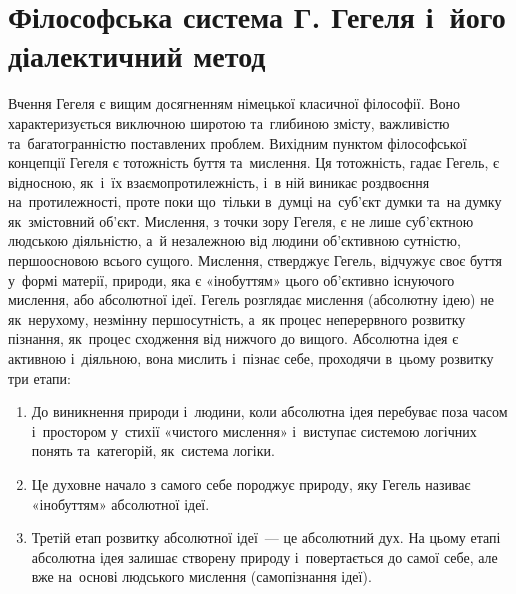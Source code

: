 \documentclass[a5paper,oneside,DIV=12,12pt,headings=small]{scrartcl}
\begin{document}
	\section{Філософська система Г. Гегеля і~його діалектичний метод}
		Вчення Гегеля є вищим досягненням німецької класичної філософії. Воно характеризується виключною широтою та~глибиною змісту, важливістю та~багатогранністю поставлених проблем. Вихідним пунктом філософської концепції Гегеля є тотожність буття та~мислення. Ця тотожність, гадає Гегель, є відносною, як~і~їх взаємопротилежність, і~в ній виникає роздвоєння на~протилежності, проте поки що~тільки в~думці на~суб'єкт думки та~на думку як~змістовний об'єкт. Мислення, з точки зору Гегеля, є не лише суб'єктною людською діяльністю, а~й незалежною від людини об'єктивною сутністю, першоосновою всього сущого. Мислення, стверджує Гегель, відчужує своє буття у~формі матерії, природи, яка є «інобуттям» цього об'єктивно існуючого мислення, або абсолютної ідеї. Гегель розглядає мислення (абсолютну ідею) не як~нерухому, незмінну першосутність, а~як процес неперервного розвитку пізнання, як~процес сходження від нижчого до вищого. Абсолютна ідея є активною і~діяльною, вона мислить і~пізнає себе, проходячи в~цьому розвитку три етапи:
		\begin{enumerate}
			\item До виникнення природи і~людини, коли абсолютна ідея перебуває поза часом і~простором у~стихії «чистого мислення» і~виступає системою логічних понять та~категорій, як~система логіки.
			\item Це духовне начало з самого себе породжує природу, яку Гегель називає «інобуттям» абсолютної ідеї.
			\item Третій етап розвитку абсолютної ідеї~— це абсолютний дух. На цьому етапі абсолютна ідея залишає створену природу і~повертається до самої себе, але вже на~основі людського мислення (самопізнання ідеї).
		\end{enumerate}
\end{document}

